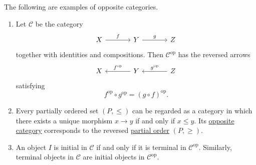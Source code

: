 	\begin{example}
	  \label{ex:opposite-categories}
		The following are examples of opposite categories.
		\begin{enumerate}
			\item Let $\mathcal C$ be the category
				\begin{equation}
					\begin{tikzcd}[column sep=large]
						X \arrow[r, "f"] & Y \arrow[r, "g"] & Z
					\end{tikzcd}
				\end{equation}
				together with identities and compositions. Then
				$\mathcal C^{\mathrm{op}}$ has the reversed arrows
				\begin{equation}
					\begin{tikzcd}[column sep=large]
						X & Y \arrow[l, "f^{\mathrm{op}}"']
							& Z \arrow[l, "g^{\mathrm{op}}"']
					\end{tikzcd}
				\end{equation}
				satisfying
				\begin{equation}
					f^{\mathrm{op}} \circ g^{\mathrm{op}}
					= (g \circ f)^{\mathrm{op}}.
				\end{equation}

			\item Every partially ordered set $(P,\leq)$ can be
				regarded as a category in which there exists a unique
				morphism $x \to y$ if and only if $x \leq y$.
				Its \hyperref[def:opposite-category]{opposite category} corresponds to the reversed
				\hyperref[st-def:partial-order]{partial order} $(P,\geq)$.

			\item An object $I$ is initial in $\mathcal C$ if and
				only if it is terminal in $\mathcal C^{\mathrm{op}}$.
				Similarly, terminal objects in $\mathcal C$ are
				initial objects in $\mathcal C^{\mathrm{op}}$.
		\end{enumerate}
	\end{example}


